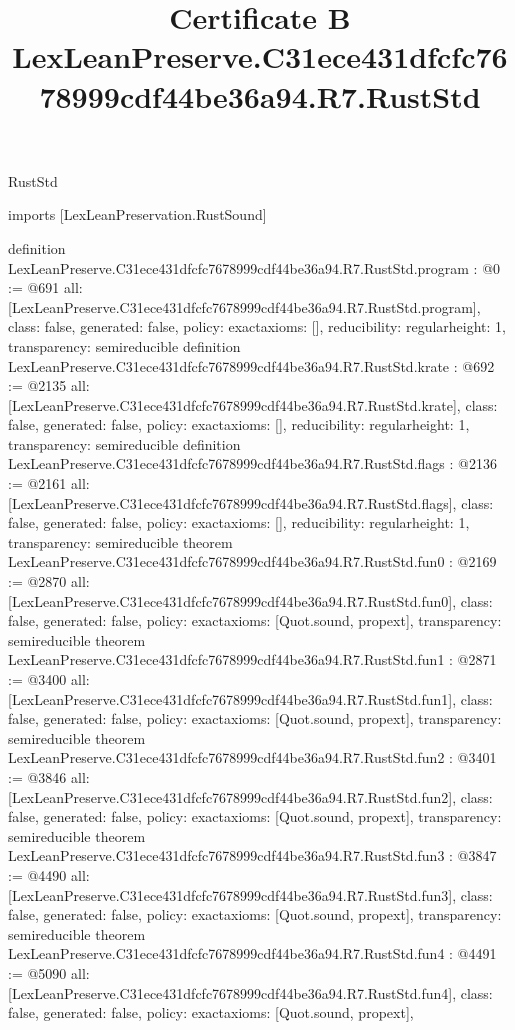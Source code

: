 \begin{lexlean}{RustStd}
\title{Certificate B LexLeanPreserve.C31ece431dfcfc7678999cdf44be36a94.R7.RustStd}
\begin{coremodule}
imports [LexLeanPreservation.RustSound]

definition LexLeanPreserve.C31ece431dfcfc7678999cdf44be36a94.R7.RustStd.program : @0 := @691 {
  all: [LexLeanPreserve.C31ece431dfcfc7678999cdf44be36a94.R7.RustStd.program],
  class: false,
  generated: false,
  policy: exact{axioms: []},
  reducibility: regular{height: 1},
  transparency: semireducible
}
definition LexLeanPreserve.C31ece431dfcfc7678999cdf44be36a94.R7.RustStd.krate : @692 := @2135 {
  all: [LexLeanPreserve.C31ece431dfcfc7678999cdf44be36a94.R7.RustStd.krate],
  class: false,
  generated: false,
  policy: exact{axioms: []},
  reducibility: regular{height: 1},
  transparency: semireducible
}
definition LexLeanPreserve.C31ece431dfcfc7678999cdf44be36a94.R7.RustStd.flags : @2136 := @2161 {
  all: [LexLeanPreserve.C31ece431dfcfc7678999cdf44be36a94.R7.RustStd.flags],
  class: false,
  generated: false,
  policy: exact{axioms: []},
  reducibility: regular{height: 1},
  transparency: semireducible
}
theorem LexLeanPreserve.C31ece431dfcfc7678999cdf44be36a94.R7.RustStd.fun0 : @2169 := @2870 {
  all: [LexLeanPreserve.C31ece431dfcfc7678999cdf44be36a94.R7.RustStd.fun0],
  class: false,
  generated: false,
  policy: exact{axioms: [Quot.sound, propext]},
  transparency: semireducible
}
theorem LexLeanPreserve.C31ece431dfcfc7678999cdf44be36a94.R7.RustStd.fun1 : @2871 := @3400 {
  all: [LexLeanPreserve.C31ece431dfcfc7678999cdf44be36a94.R7.RustStd.fun1],
  class: false,
  generated: false,
  policy: exact{axioms: [Quot.sound, propext]},
  transparency: semireducible
}
theorem LexLeanPreserve.C31ece431dfcfc7678999cdf44be36a94.R7.RustStd.fun2 : @3401 := @3846 {
  all: [LexLeanPreserve.C31ece431dfcfc7678999cdf44be36a94.R7.RustStd.fun2],
  class: false,
  generated: false,
  policy: exact{axioms: [Quot.sound, propext]},
  transparency: semireducible
}
theorem LexLeanPreserve.C31ece431dfcfc7678999cdf44be36a94.R7.RustStd.fun3 : @3847 := @4490 {
  all: [LexLeanPreserve.C31ece431dfcfc7678999cdf44be36a94.R7.RustStd.fun3],
  class: false,
  generated: false,
  policy: exact{axioms: [Quot.sound, propext]},
  transparency: semireducible
}
theorem LexLeanPreserve.C31ece431dfcfc7678999cdf44be36a94.R7.RustStd.fun4 : @4491 := @5090 {
  all: [LexLeanPreserve.C31ece431dfcfc7678999cdf44be36a94.R7.RustStd.fun4],
  class: false,
  generated: false,
  policy: exact{axioms: [Quot.sound, propext]},
}
\end{coremodule}
\end{lexlean}
